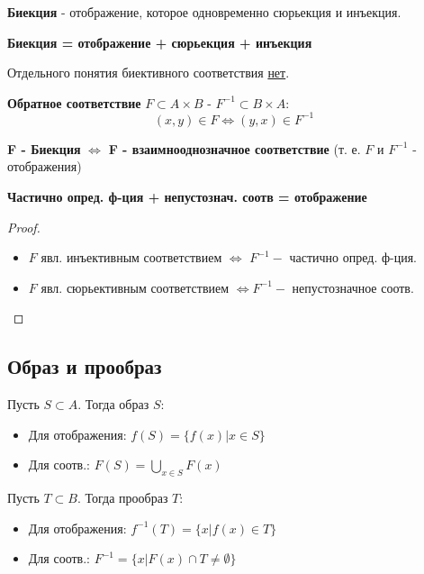 \begin{definition}
    \textbf{Биекция} - отображение, которое одновременно сюрьекция и инъекция.

    \textbf{Биекция = отображение + сюрьекция + инъекция}
\end{definition}
\begin{note}
    Отдельного понятия биективного соответствия \underline{нет}.
\end{note}
\begin{definition}
    \textbf{Обратное соответствие} $F \subset A \times B$ - $F^{-1} \subset B \times A$:
    \[
        (x, y) \in F \iff (y, x) \in F^{-1}
    \] 
\end{definition}
\begin{theorem}
    \textbf{F - Биекция} $\iff$ \textbf{F - взаимнооднозначное соответствие} (т. е. $F$ и $F^{-1}$ - отображения)
\end{theorem}
\begin{note}
        \textbf{Частично опред. ф-ция + непустознач. соотв = отображение}
\end{note}
\begin{proof}
    ~\newline
        \begin{itemize}
            \item $F$ явл. инъективным соответствием $\iff$ $F^{-1} - $ частично опред. ф-ция.
            \item $F$ явл. сюрьективным соответствием $\iff F^{-1} - $ непустозначное соотв.
        \end{itemize}
\end{proof}

\subsection{Образ и прообраз}
\begin{definition}
Пусть $S \subset A$. Тогда образ $S$: 
\begin{itemize}
    \item Для отображения: $f(S) = \{f(x) | x \in S\}$ 
    \item Для соотв.: $F(S) = \bigcup_{x \in S}^{} F(x)$
\end{itemize}
\end{definition}

\begin{definition}
Пусть $T \subset B$. Тогда прообраз $T$:
\begin{itemize}
    \item Для отображения: $f^{-1}(T) = \{x | f(x) \in T\}$
    \item Для соотв.: $F^{-1} = \{x | F(x) \cap T \neq \emptyset\}$
\end{itemize}
\end{definition}

